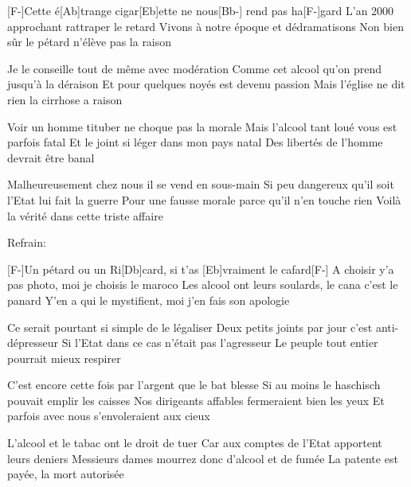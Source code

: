 

\begin{guitar}

[F-]Cette é[Ab]trange cigar[Eb]ette ne nous[Bb-] rend pas ha[F-]gard
L'an 2000 approchant rattraper le retard
Vivons à notre époque et dédramatisons
Non bien sûr le pétard n'élève pas la raison

Je le conseille tout de même avec modération
Comme cet alcool qu'on prend jusqu'à la déraison
Et pour quelques noyés est devenu passion
Mais l'église ne dit rien la cirrhose a raison

Voir un homme tituber ne choque pas la morale
Mais l'alcool tant loué vous est parfois fatal
Et le joint si léger dans mon pays natal
Des libertés de l'homme devrait être banal

Malheureusement chez nous il se vend en sous-main
Si peu dangereux qu'il soit l'Etat lui fait la guerre
Pour une fausse morale parce qu'il n'en touche rien
Voilà la vérité dans cette triste affaire

 

Refrain:

[F-]Un pétard ou un Ri[Db]card, si t'as [Eb]vraiment le cafard[F-]
A choisir y'a pas photo, moi je choisis le maroco
Les alcool ont leurs soulards, le cana c'est le panard
Y'en a qui le mystifient, moi j'en fais son apologie

Ce serait pourtant si simple de le légaliser
Deux petits joints par jour c'est anti-dépresseur
Si l'Etat dans ce cas n'était pas l'agresseur
Le peuple tout entier pourrait mieux respirer

C'est encore cette fois par l'argent que le bat blesse
Si au moins le haschisch pouvait emplir les caisses
Nos dirigeants affables fermeraient bien les yeux
Et parfois avec nous s'envoleraient aux cieux
 
L'alcool et le tabac ont le droit de tuer
Car aux comptes de l'Etat apportent leurs deniers
Messieurs dames mourrez donc d'alcool et de fumée
La patente est payée, la mort autorisée

\end{guitar}